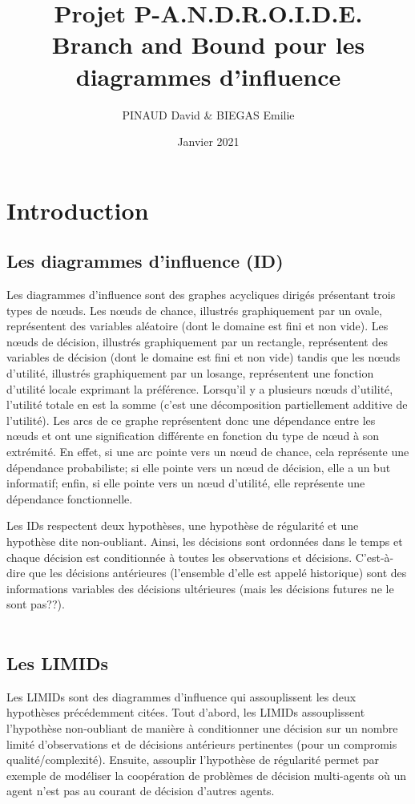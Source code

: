 \documentclass[12pt]{article}
\title{Projet P-A.N.D.R.O.I.D.E.\\
\bigbreak\textbf{Branch and Bound pour les diagrammes d'influence}}
\author{PINAUD David \& BIEGAS Emilie}
\date{Janvier 2021}
\affil{Université Sorbonne Sciences}
\begin{document}
\maketitle

\renewcommand{\contentsname}{Table des Matières}
\pagebreak
\tableofcontents
\pagebreak

\section{Introduction}

\subsection{Les diagrammes d'influence (ID)}
Les diagrammes d'influence sont des graphes acycliques dirigés présentant trois types de nœuds. 
Les nœuds de chance, illustrés graphiquement par un ovale, représentent des variables aléatoire (dont le domaine est fini et non vide). 
Les nœuds de décision, illustrés graphiquement par un rectangle, représentent des variables de décision (dont le domaine est fini et non vide) tandis que les nœuds d'utilité, illustrés graphiquement par un losange, représentent une fonction d'utilité locale exprimant la préférence.
Lorsqu'il y a plusieurs nœuds d'utilité, l'utilité totale en est la somme (c'est une décomposition partiellement additive de l'utilité).
Les arcs de ce graphe représentent donc une dépendance entre les nœuds et ont une signification différente en fonction du type de nœud à son extrémité.
En effet, si une arc pointe vers un nœud de chance, cela représente une dépendance probabiliste; si elle pointe vers un nœud de décision, elle a un but informatif; enfin, si elle pointe vers un nœud d'utilité, elle représente une dépendance fonctionnelle.

Les IDs respectent deux hypothèses, une hypothèse de régularité et une hypothèse dite non-oubliant.
Ainsi, les décisions sont ordonnées dans le temps et chaque décision est conditionnée à toutes les observations et décisions.
C'est-à-dire que les décisions antérieures (l'ensemble d'elle est appelé historique) sont des informations variables des décisions ultérieures (mais les décisions futures ne le sont pas??).
\\\\

\subsection{Les LIMIDs}
 Les LIMIDs sont des diagrammes d'influence qui assouplissent les deux hypothèses précédemment citées. Tout d'abord, les LIMIDs assouplissent l'hypothèse non-oubliant de manière à conditionner une décision sur un nombre limité d'observations et de décisions antérieurs pertinentes (pour un compromis qualité/complexité).
Ensuite, assouplir l'hypothèse de régularité permet par exemple de modéliser la coopération de problèmes de décision multi-agents où un agent n'est pas au courant de décision d'autres agents.
\end{document}
